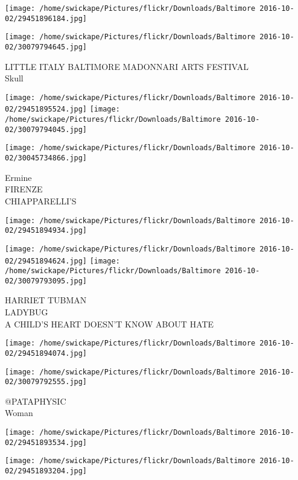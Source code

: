 \documentclass[10pt,letterpaper]{article}
\begin{document}
\texttt{[image: /home/swickape/Pictures/flickr/Downloads/Baltimore 2016-10-02/29451896184.jpg]}

\vspace{0.25in}
\texttt{[image: /home/swickape/Pictures/flickr/Downloads/Baltimore 2016-10-02/30079794645.jpg]}

LITTLE ITALY BALTIMORE MADONNARI ARTS FESTIVAL\\
Skull
\pagebreak

\texttt{[image: /home/swickape/Pictures/flickr/Downloads/Baltimore 2016-10-02/29451895524.jpg]}
\texttt{[image: /home/swickape/Pictures/flickr/Downloads/Baltimore 2016-10-02/30079794045.jpg]}

\vspace{0.25in}
\texttt{[image: /home/swickape/Pictures/flickr/Downloads/Baltimore 2016-10-02/30045734866.jpg]}

Ermine\\
FIRENZE\\
CHIAPPARELLI'S
\pagebreak

\texttt{[image: /home/swickape/Pictures/flickr/Downloads/Baltimore 2016-10-02/29451894934.jpg]}

\vspace{0.25in}
\texttt{[image: /home/swickape/Pictures/flickr/Downloads/Baltimore 2016-10-02/29451894624.jpg]}
\texttt{[image: /home/swickape/Pictures/flickr/Downloads/Baltimore 2016-10-02/30079793095.jpg]}

HARRIET TUBMAN\\
LADYBUG\\
A CHILD'S HEART DOESN'T KNOW ABOUT HATE
\pagebreak

\texttt{[image: /home/swickape/Pictures/flickr/Downloads/Baltimore 2016-10-02/29451894074.jpg]}

\vspace{0.25in}
\texttt{[image: /home/swickape/Pictures/flickr/Downloads/Baltimore 2016-10-02/30079792555.jpg]}

@PATAPHYSIC\\
Woman
\pagebreak

\texttt{[image: /home/swickape/Pictures/flickr/Downloads/Baltimore 2016-10-02/29451893534.jpg]}

\vspace{0.25in}
\texttt{[image: /home/swickape/Pictures/flickr/Downloads/Baltimore 2016-10-02/29451893204.jpg]}
\end{document}
